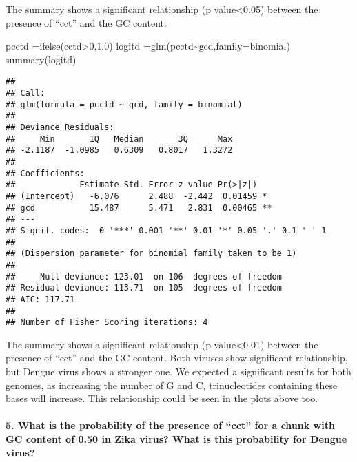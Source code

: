 \documentclass[
]{article}
\newenvironment{Shaded}{\begin{snugshade}}{\end{snugshade}}
\newcommand{\AttributeTok}[1]{\textcolor[rgb]{0.77,0.63,0.00}{#1}}
\newcommand{\DecValTok}[1]{\textcolor[rgb]{0.00,0.00,0.81}{#1}}
\newcommand{\FunctionTok}[1]{\textcolor[rgb]{0.00,0.00,0.00}{#1}}
\newcommand{\NormalTok}[1]{#1}
\newcommand{\OtherTok}[1]{\textcolor[rgb]{0.56,0.35,0.01}{#1}}
\newcommand{\SpecialCharTok}[1]{\textcolor[rgb]{0.00,0.00,0.00}{#1}}
\begin{document}
The summary shows a significant relationship (p value\textless0.05)
between the presence of ``cct'' and the GC content.

\begin{Shaded}
\begin{Highlighting}[]
\NormalTok{pcctd }\OtherTok{=}\FunctionTok{ifelse}\NormalTok{(cctd}\SpecialCharTok{\textgreater{}}\DecValTok{0}\NormalTok{,}\DecValTok{1}\NormalTok{,}\DecValTok{0}\NormalTok{)}
\NormalTok{logitd }\OtherTok{=}\FunctionTok{glm}\NormalTok{(pcctd}\SpecialCharTok{\textasciitilde{}}\NormalTok{gcd,}\AttributeTok{family=}\NormalTok{binomial)}
\FunctionTok{summary}\NormalTok{(logitd)}
\end{Highlighting}
\end{Shaded}

\begin{verbatim}
## 
## Call:
## glm(formula = pcctd ~ gcd, family = binomial)
## 
## Deviance Residuals: 
##     Min       1Q   Median       3Q      Max  
## -2.1187  -1.0985   0.6309   0.8017   1.3272  
## 
## Coefficients:
##             Estimate Std. Error z value Pr(>|z|)   
## (Intercept)   -6.076      2.488  -2.442  0.01459 * 
## gcd           15.487      5.471   2.831  0.00465 **
## ---
## Signif. codes:  0 '***' 0.001 '**' 0.01 '*' 0.05 '.' 0.1 ' ' 1
## 
## (Dispersion parameter for binomial family taken to be 1)
## 
##     Null deviance: 123.01  on 106  degrees of freedom
## Residual deviance: 113.71  on 105  degrees of freedom
## AIC: 117.71
## 
## Number of Fisher Scoring iterations: 4
\end{verbatim}

The summary shows a significant relationship (p value\textless0.01)
between the presence of ``cct'' and the GC content. Both viruses show
significant relationship, but Dengue virus shows a stronger one. We
expected a significant results for both genomes, as increasing the
number of G and C, trinucleotides containing these bases will increase.
This relationship could be seen in the plots above too.

\hypertarget{what-is-the-probability-of-the-presence-of-cct-for-a-chunk-with-gc-content-of-0.50-in-zika-virus-what-is-this-probability-for-dengue-virus}{%
\paragraph{5. What is the probability of the presence of ``cct'' for a
chunk with GC content of 0.50 in Zika virus? What is this probability
for Dengue
virus?}\label{what-is-the-probability-of-the-presence-of-cct-for-a-chunk-with-gc-content-of-0.50-in-zika-virus-what-is-this-probability-for-dengue-virus}}
\end{document}
